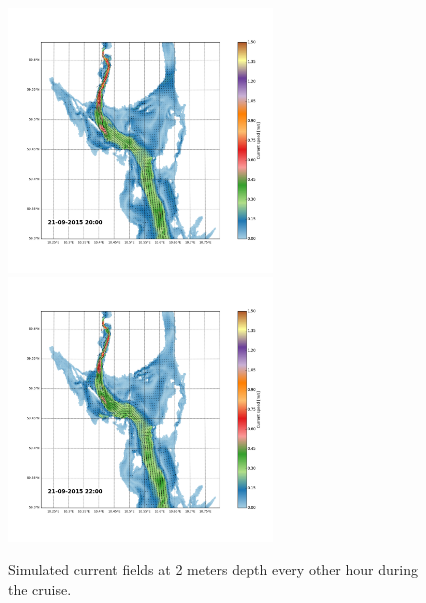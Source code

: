 \documentclass[12pt,a4paper,english]{article}
\begin{document}
\begin{figure}[h]
{}
\centerline{
\includegraphics*[trim=2.0cm 3cm 6.0cm 3.5cm,clip=true,height=7cm]{Python/stromfelt_18}
\includegraphics*[trim=3.7cm 3cm 1.3cm 3.5cm,clip=true,height=7cm]{Python/stromfelt_20}
}
\caption{\small
Simulated current fields at 2 meters depth every other hour during the cruise.}
\label{fig:Current1}
\end{figure}
\end{document}
